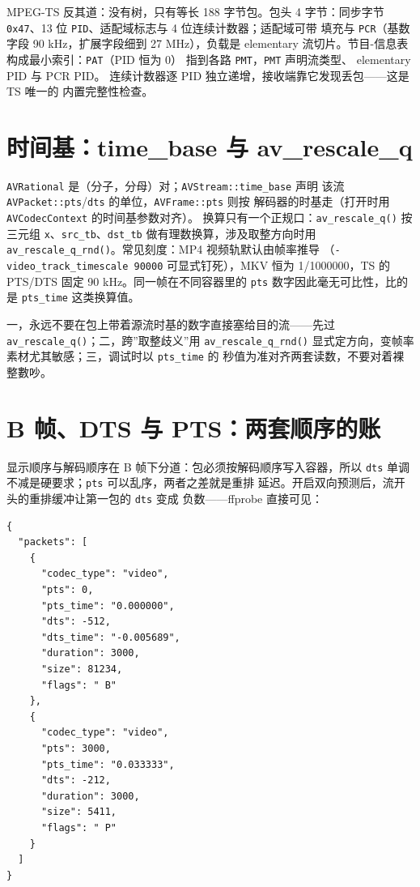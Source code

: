 \documentclass[12pt,a4paper,fontset=fandol]{ctexbook}
\newcommand{\Fn}[1]{\texttt{#1()}}
\newcommand{\Tp}[1]{\texttt{#1}}
\newcommand{\Bk}{\discretionary{}{}{}}
\begin{document}
MPEG-TS 反其道：没有树，只有等长 188 字节包。包头 4 字节：同步字节
\Tp{0x47}、13 位 \Tp{PID}、适配域标志与 4 位连续计数器；适配域可带
填充与 \Tp{PCR}（基数字段 90 kHz，扩展字段细到 27 MHz），负载是
 elementary 流切片。节目-信息表构成最小索引：\Tp{PAT}（PID 恒为 0）
指到各路 \Tp{PMT}，\Tp{PMT} 声明流类型、 elementary PID 与 PCR PID。
连续计数器逐 PID 独立递增，接收端靠它发现丢包——这是 TS 唯一的
内置完整性检查。

\section{时间基：time\_base 与 av\_rescale\_q}

\Tp{AVRational} 是（分子，分母）对；\Tp{AVStream::time\_base} 声明
该流 \Tp{AVPacket::pts}/{\Bk}\Tp{dts} 的单位，\Tp{AVFrame::pts} 则按
解码器的时基走（打开时用 \Tp{AVCodecContext} 的时间基参数对齐）。
换算只有一个正规口：\Fn{av\_rescale\_q} 按三元组
\Tp{x}、\Tp{src\_tb}、\Tp{dst\_tb} 做有理数换算，涉及取整方向时用
\Fn{av\_rescale\_q\_rnd}。常见刻度：MP4 视频轨默认由帧率推导
（\Tp{-video\_track\_timescale 90000} 可显式钉死），MKV 恒为
1/1000000，TS 的 PTS/DTS 固定 90 kHz。同一帧在不同容器里的
\Tp{pts} 数字因此毫无可比性，比的是 \Tp{pts\_time} 这类换算值。

\begin{guideline}[title={时间基三条军规}]
  一，永远不要在包上带着源流时基的数字直接塞给目的流——先过
  \Fn{av\_{\Bk}rescale\_{\Bk}q}；二，跨''取整歧义''用 \Fn{av\_{\Bk}rescale\_{\Bk}q\_{\Bk}rnd}
  显式定方向，变帧率素材尤其敏感；三，调试时以 \Tp{pts\_time} 的
  秒值为准对齐两套读数，不要对着裸整數吵。
\end{guideline}

\section{B 帧、DTS 与 PTS：两套顺序的账}

显示顺序与解码顺序在 B 帧下分道：包必须按解码顺序写入容器，所以
\Tp{dts} 单调不减是硬要求；\Tp{pts} 可以乱序，两者之差就是重排
延迟。开启双向预测后，流开头的重排缓冲让第一包的 \Tp{dts} 变成
负数——ffprobe 直接可见：

\begin{lstlisting}[style=jsonstyle,
  caption={ffprobe 包视图：\#pts 与 \#dts 的负偏移},
  label={lst:ch10-packets}]
{
  "packets": [
    {
      "codec_type": "video",
      "pts": 0,
      "pts_time": "0.000000",
      "dts": -512,
      "dts_time": "-0.005689",
      "duration": 3000,
      "size": 81234,
      "flags": " B"
    },
    {
      "codec_type": "video",
      "pts": 3000,
      "pts_time": "0.033333",
      "dts": -212,
      "duration": 3000,
      "size": 5411,
      "flags": " P"
    }
  ]
}
\end{lstlisting}
\end{document}
